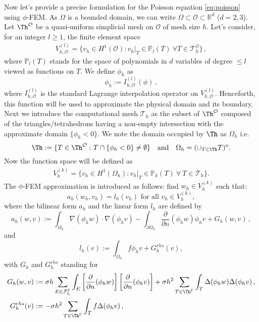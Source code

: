 Now let's provide a precise formulation for the Poisson equation \eqref{eq:poisson} using $\phi$-FEM. As $\Omega$ is a bounded domain, we can write $\Omega \subset \mathcal{O} \subset  \mathbb{R}^d$ ($d=2,3$). Let $\Th^{\mathcal{O}}$ be a quasi-uniform simplicial mesh on $\mathcal{O}$ of mesh size $h$. Let's consider, for an integer $l\ge 1$, the finite element space
\begin{eqnarray*}
 V_{h,\mathcal{O}}^{(l)} = \{v_h \in H^1 (\mathcal{O}) : v_h |_T \in \mathbb{P}_l (T)
 \  \forall T \in \mathcal{T}_h^{\mathcal{O}} \} \,,
\end{eqnarray*}
where $\mathbb{P}_l (T)$ stands for the space of polynomials in $d$ variables of degree $\le l$ viewed as functions on $T$. We define $\phi_h$ as 
$$
\phi_h:=I_{h,\mathcal{O}}^{(l)}(\phi) \,,
$$
where $I_{h,\mathcal{O}}^{(l)}$ is the standard Lagrange interpolation operator on $V_{h,\mathcal{O}}^{(l)}$. Henceforth, this function will be used to approximate the physical domain and its boundary. Next we introduce the computational mesh $\mathcal{T}_h$ as the subset of $\Th^{\mathcal{O}}$ composed of the triangles/tetrahedrons having a non-empty intersection with the approximate domain $\{\phi_h<0\}$. We note the domain occupied by $\Th$ as $\Omega_h$ i.e.
$$
\Th:=\{T \in \Th^{\mathcal{O}}:T \cap \{\phi_h<0\} \neq \emptyset\} \quad \text{and} \quad \Omega_h = (\cup_{T \in \Th}T)^o. 
$$
Now the function space will be defined as 
\begin{eqnarray*}
    V_h^{(k)} = \{v_h \in H^1 (\Omega_h) : v_h |_T \in \mathbb{P}_k (T)
    \  \forall ~T \in \mathcal{T}_h \}.
\end{eqnarray*}
The $\phi$-FEM approximation is introduced as follows: 
find $w_h\in V_h^{(k)}$ such that:
\begin{equation}\label{eq:discret prob}
  a_h(w_h,v_h)=l_h(v_h)\mbox{ for all }v_h\in V_h^{(k)},
\end{equation}
where the bilinear form $a_h$ and the linear form $l_h$ are defined by
\begin{equation}
    \label{ahPhiFEM}
   a_h(w,v):=\displaystyle \int_{\Omega_h} \nabla (\phi_h w) \cdot \nabla (\phi_h v) -
\int_{\partial \Omega_h} \frac{\partial}{\partial n} (\phi_h w) \phi_h
   v + G_h (w, v) \,,
\end{equation}	
   and
   \[\displaystyle   l_h(v):= \int_{\Omega_h} f \phi_h v+ G_h^{rhs} (v), \]
with $G_h$ and $G_h^{rhs}$ standing for
\begin{align*} 
 G_h(w, v) &: = \displaystyle\sigma h\sum_{E\in  \mathcal{F}_h^{\Gamma}} 
\int_E \left[ \frac{\partial}{\partial n}
   (\phi_h w) \right] \left[ \frac{\partial}{\partial n} ( \phi_hv)\right]
   + \sigma h^2 \sum_{T \in\Th^{\Gamma}} \int_T \Delta(\phi_h w) \Delta(\phi_h v)  
    \,, \\
   G_h^{rhs} (v) &: =\displaystyle- \sigma h^2\sum_{T \in\Th^{\Gamma}} \int_T f \Delta (\phi_h v)   
   \,,
\end{align*}
